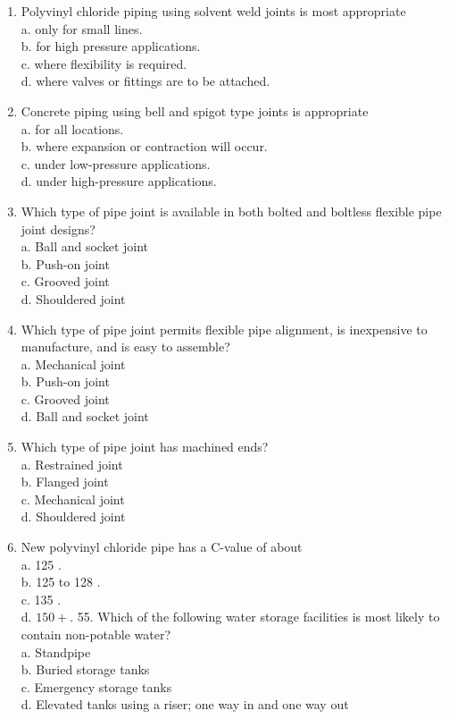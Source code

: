 \documentclass[10pt]{article}
\begin{document}
\begin{enumerate}
  \item Polyvinyl chloride piping using solvent weld joints is most appropriate\\
a. only for small lines.\\
b. for high pressure applications.\\
c. where flexibility is required.\\
d. where valves or fittings are to be attached.

  \item Concrete piping using bell and spigot type joints is appropriate\\
a. for all locations.\\
b. where expansion or contraction will occur.\\
c. under low-pressure applications.\\
d. under high-pressure applications.

  \item Which type of pipe joint is available in both bolted and boltless flexible pipe joint designs?\\
a. Ball and socket joint\\
b. Push-on joint\\
c. Grooved joint\\
d. Shouldered joint

  \item Which type of pipe joint permits flexible pipe alignment, is inexpensive to manufacture, and is easy to assemble?\\
a. Mechanical joint\\
b. Push-on joint\\
c. Grooved joint\\
d. Ball and socket joint

  \item Which type of pipe joint has machined ends?\\
a. Restrained joint\\
b. Flanged joint\\
c. Mechanical joint\\
d. Shouldered joint

  \item New polyvinyl chloride pipe has a C-value of about\\
a. 125 .\\
b. 125 to 128 .\\
c. 135 .\\
d. $150+$. 55. Which of the following water storage facilities is most likely to contain non-potable water?\\
a. Standpipe\\
b. Buried storage tanks\\
c. Emergency storage tanks\\
d. Elevated tanks using a riser; one way in and one way out


\end{enumerate}
\end{document}
